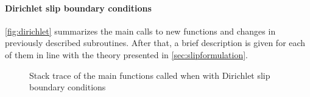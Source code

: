 \documentclass{ucb}
\begin{document}
\paragraph{Dirichlet slip boundary conditions}

\autoref{fig:dirichlet} summarizes the main calls to new functions and changes in previously described subroutines. After that, a brief description is given for each of them in line with the theory presented in \autoref{sec:slipformulation}.

\begin{figure}[H]
    \caption{Stack trace of the main functions called when with Dirichlet slip boundary conditions}
    \label{fig:dirichlet}
\end{figure}

\pagebreak
\end{document}
